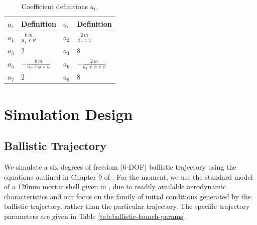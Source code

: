 \documentclass[conf]{new-aiaa}
\DeclareMathOperator{\cs}{c}
\begin{document}
\begingroup
\footnotesize
\setlength{\tabcolsep}{4pt}
\renewcommand{\arraystretch}{1.05}
\begin{table}[t]
\centering
\caption{Coefficient definitions $a_i$.}
\label{tab:a-coeffs}
\begin{tabular}{ll@{\hskip 18pt}ll}
\toprule
$a_i$ & Definition & $a_i$ & Definition \\
\midrule
$a_1$ & $\displaystyle \frac{6\,m}{u_T\,\cs\psi}$
& $a_2$ & $\displaystyle \frac{2\,m}{u_T\,\cs\psi}$ \\
$a_3$ & $2$ & $a_4$ & $8$ \\
$a_5$ & $\displaystyle -\frac{6\,m}{u_T\,\cs\phi\,\cs\psi}$
& $a_6$ & $\displaystyle -\frac{2\,m}{u_T\,\cs\phi\,\cs\psi}$ \\
$a_7$ & $2$ & $a_8$ & $8$ \\
\bottomrule
\end{tabular}
\end{table}
\endgroup

\section{Simulation Design}
\subsection{Ballistic Trajectory}
We simulate a six degrees of freedom (6-DOF) ballistic trajectory using the equations outlined in Chapter 9 of \cite{refs:mccoy1999modern}. For the moment, we use the standard model of a 120mm mortar shell given in \cite{refs:mccoy1999modern}, due to readily available aerodynamic characteristics and our focus on the family of initial conditions generated by the ballistic trajectory, rather than the particular trajectory. The specific trajectory parameters are given in Table \ref{tab:ballistic-launch-params}.    
\end{document}
